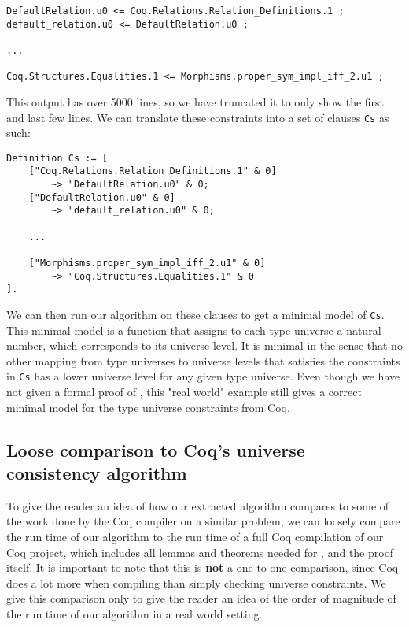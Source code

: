 \begin{minipage}{\linewidth}
\begin{lstlisting}[language=Coq, label={lst:universe_hierarchy}, caption={Universe hierarchy in \lstinline{Main.v}}]
DefaultRelation.u0 <= Coq.Relations.Relation_Definitions.1 ;
default_relation.u0 <= DefaultRelation.u0 ;

...

Coq.Structures.Equalities.1 <= Morphisms.proper_sym_impl_iff_2.u1 ;
\end{lstlisting}
\end{minipage}

This output has over 5000 lines, so we have truncated it to only show the first and last few lines.
We can translate these constraints into a set of clauses \lstinline{Cs} as such:

\begin{minipage}{\linewidth}
\begin{lstlisting}[language=Coq, label={lst:universe_hierarchy_clauses}, caption={Universe hierarchy as clauses}]
Definition Cs := [
    ["Coq.Relations.Relation_Definitions.1" & 0]
        ~> "DefaultRelation.u0" & 0;
    ["DefaultRelation.u0" & 0]
        ~> "default_relation.u0" & 0;

    ...

    ["Morphisms.proper_sym_impl_iff_2.u1" & 0]
        ~> "Coq.Structures.Equalities.1" & 0
].
\end{lstlisting}
\end{minipage}

We can then run our algorithm on these clauses to get a minimal model of \lstinline{Cs}.
This minimal model is a function that assigns to each type universe a natural number,
which corresponds to its universe level. It is minimal in the sense that no other mapping from
type universes to universe levels that satisfies the constraints in \lstinline{Cs} has a lower
universe level for any given type universe.
Even though we have not given a formal proof of ,
this "real world" example still gives a correct minimal model for the type universe constraints from Coq.

\subsection{Loose comparison to Coq's universe consistency algorithm}

To give the reader an idea of how our extracted algorithm compares to some of
the work done by the Coq compiler on a similar problem, we can
loosely compare the run time of our algorithm to the run time of
a full Coq compilation of our Coq project, which includes all
lemmas and theorems needed for , and the proof itself.
It is important to note that this is \textbf{not} a one-to-one comparison,
since Coq does a lot more when compiling than simply checking universe constraints.
We give this comparison only to give the reader an idea of the order of magnitude of the run time of our algorithm
in a real world setting.


